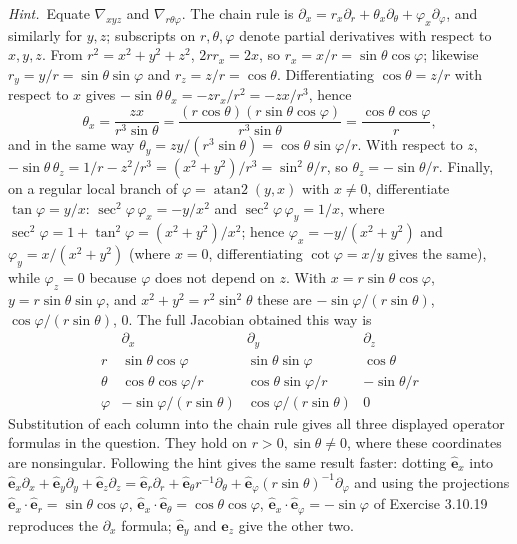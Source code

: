 \emph{Hint.}~Equate $\nabla_{xyz}$ and $\nabla_{r\theta\varphi}$.
\solution
The chain rule is $\partial_x=r_x\partial_r+\theta_x\partial_\theta+
\varphi_x\partial_\varphi$, and similarly for $y,z$; subscripts on
$r,\theta,\varphi$ denote partial derivatives with respect to $x,y,z$.
From $r^2=x^2+y^2+z^2$, $2rr_x=2x$, so $r_x=x/r=\sin\theta\cos\varphi$;
likewise $r_y=y/r=\sin\theta\sin\varphi$ and $r_z=z/r=\cos\theta$.
Differentiating $\cos\theta=z/r$ with respect to $x$ gives
$-\sin\theta\,\theta_x=-zr_x/r^2=-zx/r^3$, hence
\[
\theta_x=\frac{zx}{r^3\sin\theta}
=\frac{(r\cos\theta)(r\sin\theta\cos\varphi)}{r^3\sin\theta}
=\frac{\cos\theta\cos\varphi}r,
\]
and in the same way $\theta_y=zy/(r^3\sin\theta)=\cos\theta\sin\varphi/r$.
With respect to $z$,
$-\sin\theta\,\theta_z=1/r-z^2/r^3=(x^2+y^2)/r^3=\sin^2\theta/r$, so
$\theta_z=-\sin\theta/r$.
Finally, on a regular local branch of $\varphi=\operatorname{atan2}(y,x)$
with $x\ne0$, differentiate $\tan\varphi=y/x$:
$\sec^2\varphi\,\varphi_x=-y/x^2$ and $\sec^2\varphi\,\varphi_y=1/x$, where
$\sec^2\varphi=1+\tan^2\varphi=(x^2+y^2)/x^2$; hence
$\varphi_x=-y/(x^2+y^2)$ and $\varphi_y=x/(x^2+y^2)$ (where $x=0$,
differentiating $\cot\varphi=x/y$ gives the same), while $\varphi_z=0$
because $\varphi$ does not depend on $z$. With
$x=r\sin\theta\cos\varphi$, $y=r\sin\theta\sin\varphi$, and
$x^2+y^2=r^2\sin^2\theta$ these are
$-\sin\varphi/(r\sin\theta)$, $\cos\varphi/(r\sin\theta)$, $0$.
The full Jacobian obtained this way is
\[
\begin{array}{c|ccc}
&\partial_x&\partial_y&\partial_z\\\hline
r&\sin\theta\cos\varphi&\sin\theta\sin\varphi&\cos\theta\\
\theta&\cos\theta\cos\varphi/r&\cos\theta\sin\varphi/r&-\sin\theta/r\\
\varphi&-\sin\varphi/(r\sin\theta)&\cos\varphi/(r\sin\theta)&0
\end{array}
\]
Substitution of each column into the chain rule gives all three displayed operator
formulas in the question. They hold on $r>0,\sin\theta\ne0$,
where these coordinates are nonsingular.
Following the hint gives the same result faster: dotting
$\hat{\mathbf e}_x$ into
$\hat{\mathbf e}_x\partial_x+\hat{\mathbf e}_y\partial_y+\hat{\mathbf e}_z\partial_z
=\hat{\mathbf e}_r\partial_r+\hat{\mathbf e}_\theta r^{-1}\partial_\theta
+\hat{\mathbf e}_\varphi(r\sin\theta)^{-1}\partial_\varphi$
and using the projections
$\hat{\mathbf e}_x\cdot\hat{\mathbf e}_r=\sin\theta\cos\varphi$,
$\hat{\mathbf e}_x\cdot\hat{\mathbf e}_\theta=\cos\theta\cos\varphi$,
$\hat{\mathbf e}_x\cdot\hat{\mathbf e}_\varphi=-\sin\varphi$ of
Exercise 3.10.19 reproduces the $\partial_x$ formula; $\hat{\mathbf e}_y$
and $\hat{\mathbf e}_z$ give the other two.

